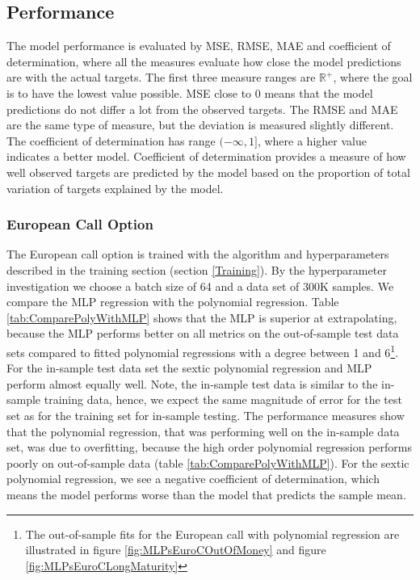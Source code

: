 \subsection{Performance}
The model performance is evaluated by MSE, RMSE, MAE and coefficient of determination, where all the measures evaluate how close the model predictions are with the actual targets. The first three measure ranges are $\mathbb{R}^+$, where the goal is to have the lowest value possible. MSE close to 0 means that the model predictions do not differ a lot from the observed targets. The RMSE and MAE are the same type of measure, but the deviation is measured slightly different. The coefficient of determination has range $(-\infty, 1]$, where a higher value indicates a better model. Coefficient of determination provides a measure of how well observed targets are predicted by the model based on the proportion of total variation of targets explained by the model.

\subsubsection{European Call Option}
The European call option is trained with the algorithm and hyperparameters described in the training section (section \ref{Training}). By the hyperparameter investigation we choose a batch size of 64 and a data set of 300K samples. We compare the MLP regression with the polynomial regression. Table \ref{tab:ComparePolyWithMLP} shows that the MLP is superior at extrapolating, because the MLP performs better on all metrics on the out-of-sample test data sets compared to fitted polynomial regressions with a degree between 1 and 6\footnote{The out-of-sample fits for the European call with polynomial regression are illustrated in figure \ref{fig:MLPsEuroCOutOfMoney} and figure \ref{fig:MLPsEuroCLongMaturity}}. For the in-sample test data set the sextic polynomial regression and MLP perform almost equally well. Note, the in-sample test data is similar to the in-sample training data, hence, we expect the same magnitude of error for the test set as for the training set for in-sample testing. The performance measures show that the polynomial regression, that was performing well on the in-sample data set, was due to overfitting, because the high order polynomial regression performs poorly on out-of-sample data (table \ref{tab:ComparePolyWithMLP}). For the sextic polynomial regression, we see a negative coefficient of determination, which means the model performs worse than the model that predicts the sample mean. \\

